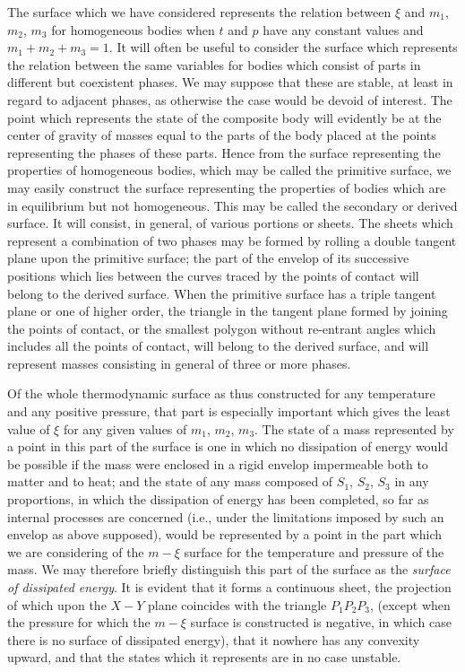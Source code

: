 \documentclass[12pt]{article}
\begin{document}
The surface which we have considered represents the relation between $\xi$ and $m_1$, $m_2$, $m_3$ for homogeneous bodies when $t$ and $p$ have any constant values and $m_1+m_2+m_3= 1$. It will often be useful to consider the surface which represents the relation between the same variables for bodies which consist of parts in different but coexistent phases. We may suppose that these are stable, at least in regard to adjacent phases, as otherwise the case would be devoid of interest. The point which represents the state of the composite body will evidently be at the center of gravity of masses equal to the parts of the body placed at the points representing the phases of these parts. Hence from the surface representing the properties of homogeneous bodies, which may be called the primitive surface, we may easily construct the surface representing the properties of bodies which are in equilibrium but not homogeneous. This may be called the secondary or derived surface. It will consist, in general, of various portions or sheets. The sheets which represent a combination of two phases may be formed by rolling a double tangent plane upon the primitive surface; the part of the envelop of its successive positions which lies between the curves traced by the points of contact will belong to the derived surface. When the primitive surface has a triple tangent plane or one of higher order, the triangle in the tangent plane formed by joining the points of contact, or the smallest polygon without re-entrant angles which includes all the points of contact, will belong to the derived surface, and will represent masses consisting in general of three or more phases.


Of the whole thermodynamic surface as thus constructed for any temperature and any positive pressure, that part is especially important which gives the least value of $\xi$ for any given values of $m_1$, $m_2$, $m_3$. The state of a mass represented by a point in this part of the surface is one in which no dissipation of energy would be possible if the mass were enclosed in a rigid envelop impermeable both to matter and to heat; and the state of any mass composed of $S_1$, $S_2$, $S_3$ in any proportions, in which the dissipation of energy has been completed, so far as internal processes are concerned (i.e., under the limitations imposed by such an envelop as above supposed), would be represented by a point in the part which we are considering of the $m\!-\xi$ surface for the temperature and pressure of the mass. We may therefore briefly distinguish this part of the surface as the \textit{surface of dissipated energy}. It is evident that it forms a continuous sheet, the projection of which upon the $X\!-Y$ plane coincides with the triangle $P_1 P_2 P_3$, (except when the pressure for which the $m\!-\xi$ surface is constructed is negative, in which case there is no surface of dissipated energy), that it nowhere has any convexity upward, and that the states which it represents are in no case unstable.
\end{document}
